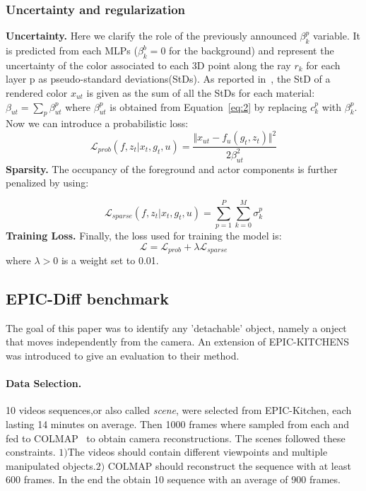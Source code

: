\subsubsection{Uncertainty and regularization}
\textbf{Uncertainty.} Here we clarify the role of the previously announced $\beta_k^p$ variable.
It is predicted from each MLPs ($\beta_k^b = 0$ for the background) and represent the uncertainty
of the color associated to each 3D point along the ray $r_k$ for each layer p as pseudo-standard
deviations(StDs). As reported in~\cite{ndiff_17}, the StD of a rendered color $x_{ut}$ is given
as the sum of all the StDs for each material: $\beta_{ut} = \sum_{p} \beta_{u t}^p$ where 
$\beta_{u t}^p$ is obtained from Equation~\ref{eq:2} by replacing $c_k^p$ with $\beta_k^p$.
Now we can introduce a probabilistic loss:
\begin{equation}
    \mathcal{L}_{prob}(f,z_t \vert x_t, g_t,u) = \frac{\Vert x_{ut} - f_u(g_t,z_t)\Vert^2}{2 \beta_{ut}^2}
\end{equation}
\textbf{Sparsity.} The occupancy of the foreground and actor components is further penalized
by using:

\begin{equation}
    \mathcal{L}_{sparse}(f,z_t \vert x_t, g_t,u) = \sum_{p=1}^{P}\sum_{k=0}^{M} \sigma_k^p
\end{equation}
\textbf{Training Loss.} Finally, the loss used for training the model is:
\begin{equation}
    \mathcal{L} = \mathcal{L}_{prob}+\lambda \mathcal{L}_{sparse}
\end{equation}
where $\lambda>0$ is a weight set to 0.01.

\subsection{EPIC-Diff benchmark}
The goal of this paper was to identify any 'detachable' object, namely a onject that moves independently
from the camera. An extension of EPIC-KITCHENS~\cite{EPICKITCHENS} was introduced to give an evaluation to their method.

\paragraph{Data Selection.}10 videos sequences,or also called \textit{scene}, were selected from EPIC-Kitchen, each lasting 14 minutes
on average. Then 1000 frames where sampled from each and fed to COLMAP~\cite{colmap} to obtain
camera reconstructions. The scenes followed these constraints. $1)$The videos
should contain different viewpoints and multiple manipulated objects.$2)$ COLMAP should reconstruct
the sequence with at least 600 frames. In the end the obtain 10 sequence with an average of 900 frames.

